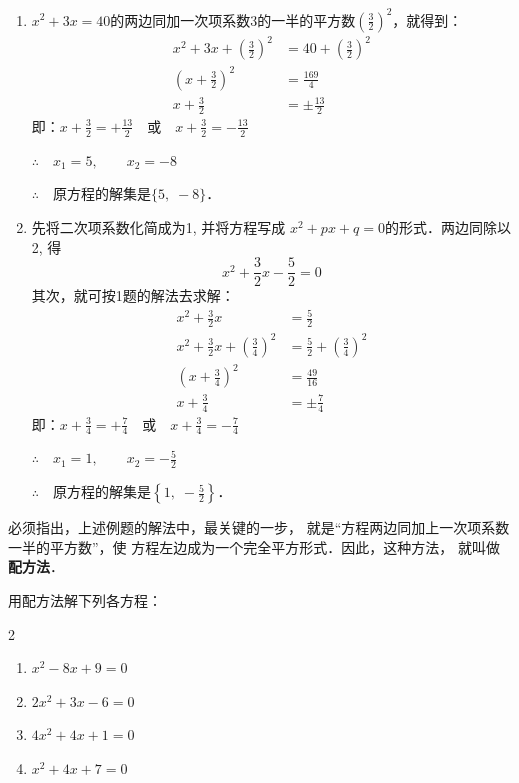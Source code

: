 \begin{solution}
\begin{enumerate}
    \item $x^2+3x=40$的两边同加一次项系数3的一半的平方数$\left(\frac{3}{2}\right)^2$，就得到：
\begin{align*}
    x^2+3x+ \left(\frac{3}{2}\right)^2&=40+\left(\frac{3}{2}\right)^2\\
    \left(x+\frac{3}{2}\right)^2&=\frac{169}{4}\\
    x+\frac{3}{2}&=\pm\frac{13}{2}  \tag{平方根的定义}
\end{align*}
即：$x+\frac{3}{2}=+\frac{13}{2}\quad \text{或}\quad x+\frac{3}{2}=-\frac{13}{2}$

$\therefore\quad x_1=5,\qquad x_2=-8$

$\therefore\quad $原方程的解集是$\{5,\;-8\}$．
\item 先将二次项系数化简成为1, 并将方程写成
$x^2+px+q=0$的形式．两边同除以2, 得
\[x^2+\frac{3}{2}x-\frac{5}{2}=0 \]
其次，就可按1题的解法去求解：
\begin{align*}
    x^2+\frac{3}{2}x&=\frac{5}{2}\tag{移项}\\
    x^2+\frac{3}{2}x+\left(\frac{3}{4}\right)^2&=\frac{5}{2}+\left(\frac{3}{4}\right)^2 \tag{配方}\\
    \left(x+\frac{3}{4}\right)^2&=\frac{49}{16}\\
    x+\frac{3}{4}&=\pm\frac{7}{4} \tag{平方根意义}
\end{align*}
即：$x+\frac{3}{4}=+\frac{7}{4} \quad \text{或}\quad x+\frac{3}{4}=-\frac{7}{4} $

$\therefore\quad x_1=1,\qquad x_2=-\frac{5}{2}$

$\therefore\quad $原方程的解集是$\left\{1,\;-\frac{5}{2}\right\}$．
\end{enumerate}
\end{solution}

必须指出，上述例题的解法中，最关键的一步，
就是“方程两边同加上一次项系数一半的平方数”，使
方程左边成为一个完全平方形式．因此，这种方法，
就叫做\textbf{配方法}．

\begin{example}
    用配方法解下列各方程：
\begin{multicols}{2}
\begin{enumerate}
    \item $x^2-8x+9=0$
\item $2x^2+3x-6=0$
\item $4x^2+4x+1=0$
\item $x^2+4x+7=0$
\end{enumerate}
\end{multicols}
\end{example}

